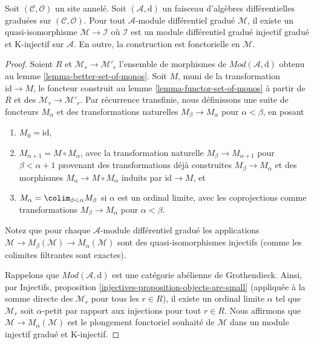 \begin{theorem}
\label{theorem-qis-into-dg-injective}
Soit $(\mathcal{C}, \mathcal{O})$ un site annelé.
Soit $(\mathcal{A}, \text{d})$ un faisceau d'algèbres différentielles graduées sur $(\mathcal{C}, \mathcal{O})$.
Pour tout $\mathcal{A}$-module différentiel gradué $\mathcal{M}$, il existe un quasi-isomorphisme $\mathcal{M} \to \mathcal{I}$ où $\mathcal{I}$ est un module différentiel gradué injectif gradué et K-injectif sur $\mathcal{A}$.
En outre, la construction est fonctorielle en $\mathcal{M}$.
\end{theorem}

\begin{proof}
Soient $R$ et $\mathcal{M}_r \to \mathcal{M}'_r$ l'ensemble de morphismes de $\textit{Mod}(\mathcal{A}, \text{d})$ obtenu au lemme \ref{lemma-better-set-of-monos}.
Soit $M$, muni de la transformation $\text{id} \to M$, le foncteur construit au lemme \ref{lemma-functor-set-of-monos} à partir de $R$ et des $\mathcal{M}_r \to \mathcal{M}'_r$.
Par récurrence transfinie, nous définissons une suite de foncteurs $M_\alpha$ et des transformations naturelles $M_\beta \to M_\alpha$ pour $\alpha < \beta$, en posant
\begin{enumerate}
\item $M_0 = \text{id}$, \item $M_{\alpha + 1} = M \circ M_\alpha$, avec la transformation naturelle $M_\beta \to M_{\alpha + 1}$ pour $\beta < \alpha + 1$ provenant des transformations déjà construites $M_\beta \to M_\alpha$ et des morphismes $M_\alpha \to M \circ M_\alpha$ induits par $\text{id} \to M$, et \item $M_\alpha = \colim_{\beta < \alpha} M_\beta$ si $\alpha$ est un ordinal limite, avec les coprojections comme transformations $M_\beta \to M_\alpha$ pour $\alpha < \beta$.
\end{enumerate}
Notez que pour chaque $\mathcal{A}$-module différentiel gradué les applications $\mathcal{M} \to M_\beta(\mathcal{M}) \to M_\alpha(\mathcal{M})$ sont des quasi-isomorphismes injectifs (comme les colimites filtrantes sont exactes).

\medskip\noindent
Rappelons que $\textit{Mod}(\mathcal{A}, \text{d})$ est une catégorie abélienne de Grothendieck.
Ainsi, par Injectifs, proposition \ref{injectives-proposition-objects-are-small} (appliquée à la somme directe des $\mathcal{M}_r$ pour tous les $r \in R$), il existe un ordinal limite $\alpha$ tel que $\mathcal{M}_r$ soit $\alpha$-petit par rapport aux injections pour tout $r \in R$.
Nous affirmons que $\mathcal{M} \to M_\alpha(\mathcal{M})$ est le plongement fonctoriel souhaité de $\mathcal{M}$ dans un module injectif gradué et K-injectif.


\end{proof}
